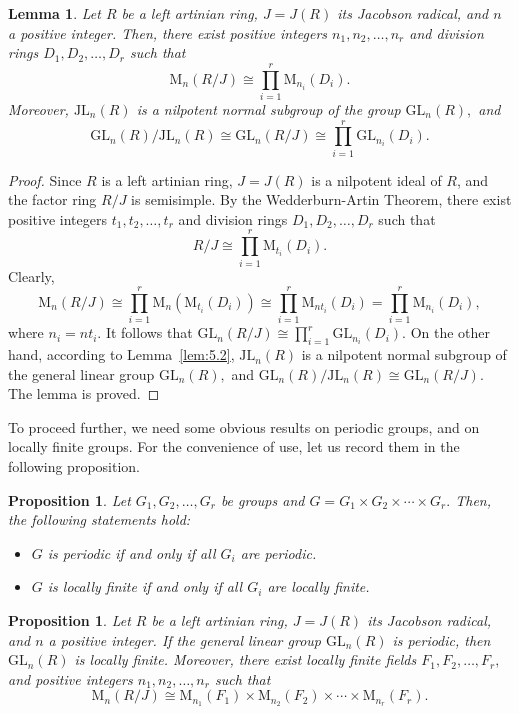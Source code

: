 \documentclass{amsart}
\newtheorem{lemma}[theorem]{Lemma}
\newtheorem{proposition}[theorem]{Proposition}
\theoremstyle{definition}
\begin{document}
\begin{lemma}\label{lem:5.4} Let $R$ be a left artinian ring, $J=J(R)$ its Jacobson radical, and $n$ a positive integer. Then, there exist positive integers $n_1, n_2,\ldots, n_r$ and division rings $D_1, D_2,\ldots, D_r$ such that  $$\mathrm{M}_n(R/J)\cong \prod_{i=1}^{r}\mathrm{M}_{n_i}(D_i).$$ Moreover, $\mathrm{JL}_n(R)$ is a nilpotent normal subgroup of the group $\mathrm{GL}_n(R),$ and $$\mathrm{GL}_n(R)/\mathrm{JL}_n(R)\cong\mathrm{GL}_n(R/J)\cong \prod_{i=1}^{r}\mathrm{GL}_{n_i}(D_i).$$
\end{lemma}
\begin{proof} Since $R$ is a left artinian ring, $J=J(R)$ is a nilpotent ideal of $R$, and the factor ring $R/J$ is semisimple. By the Wedderburn-Artin Theorem, there exist positive integers $t_1,t_2,\ldots, t_r$ and division rings $D_1, D_2,\ldots, D_r$ such that $$R/J\cong\prod_{i=1}^{r}\mathrm{M}_{t_i}(D_i).$$ Clearly, $$\mathrm{M}_n(R/J)\cong\prod_{i=1}^{r}\mathrm{M}_n(\mathrm{M}_{t_i}(D_i))\cong\prod_{i=1}^{r}\mathrm{M}_{nt_i}(D_i)=\prod_{i=1}^{r}\mathrm{M}_{n_i}(D_i),$$ where $n_i=nt_i$. It follows that $\mathrm{GL}_n(R/J)\cong \prod_{i=1}^{r}\mathrm{GL}_{n_i}(D_i).$ On the other hand, according to Lemma~\ref{lem:5.2}, $\mathrm{JL}_n(R)$ is a nilpotent normal subgroup of the general linear group $\mathrm{GL}_n(R),$ and $\mathrm{GL}_n(R)/\mathrm{JL}_n(R)\cong\mathrm{GL}_n(R/J).$ The lemma is proved.
\end{proof}
To proceed further, we need some obvious results on periodic groups, and on locally finite groups.  For the convenience of use, let us record them in the following proposition.
\begin{proposition}\label{pro:5.5} Let $G_1, G_2,\ldots, G_r$ be groups and $G=G_1\times G_2\times\cdots\times G_r.$ Then, the following statements hold:
	\begin{itemize}
		\item [(1)] $G$ is periodic if and only if all $G_i$ are periodic.
		\item [(2)] $G$ is locally finite if and only if all $G_i$ are locally finite.	
	\end{itemize}	
\end{proposition}
\begin{proposition}\label{pro:5.6} Let $R$ be a left artinian ring, $J=J(R)$ its Jacobson radical,  and $n$ a positive integer. If the general linear group $\mathrm{GL}_n(R)$ is periodic, then $\mathrm{GL}_n(R)$ is locally finite. Moreover, there exist locally finite fields $F_1, F_2, \ldots, F_r,$ and positive integers $n_1, n_2,\ldots, n_r$ such that $$\mathrm{M}_n(R/J)\cong \mathrm{M}_{n_1}(F_1)\times \mathrm{M}_{n_2}(F_2)\times\cdots\times \mathrm{M}_{n_r}(F_r).$$
\end{proposition}
\end{document}
